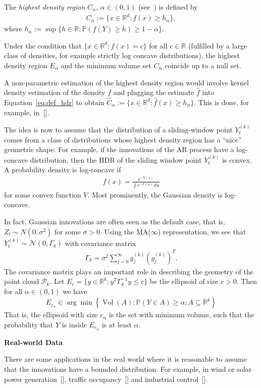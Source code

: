The \textit{highest density region} $C_{\alpha}$, $\alpha\in(0,1)$ (see~\cite{Hyndman01051996}) is defined by
\begin{align}\label{eq:def_hdr}
    C_{\alpha}:=\{x\in\mathbb{R}^d:f(x)\ge h_{\alpha}\},
\end{align}
where $h_{\alpha}:=\sup\{h\in\mathbb{R}:\mathbb{P}(f(Y)\ge h)\ge 1-\alpha\}$.

Under the condition that $\{x\in\mathbb{R}^d:f(x)=c\}$ for all $c\in\mathbb{R}$ (fulfilled by a large class of densities, for example strictly log concave distributions), the highest density region $E_{\alpha}$ and the minimum volume set $C_{\alpha}$ coincide up to a null set. 

A non-parametric estimation of the highest density region would involve kernel density estimation of the density $f$ and plugging the estimate $\hat{f}$ into Equation~\eqref{eq:def_hdr} to obtain $\hat{C}_{\alpha}:=\{x\in\mathbb{R}^d:\hat{f}(x)\ge h_{\alpha}\}$. This is done, for example, in~[].

The idea is now to assume that the distribution of a sliding-window point $Y_t^{(k)}$ comes from a class of distributions whose highest density region has a \enquote{nice} geometric shape. For example, if the innovations of the AR process have a log-concave distribution, then the HDR of the sliding window point $Y_t^{(k)}$ is convex. A probability density is log-concave if
\begin{align*}
    f(x)=\frac{e^{-V(x)}}{\int e^{-V(u)}\,du}
\end{align*}
for some convex function $V$. Most prominently, the Gaussian density is log-concave.

In fact, Gaussian innovations are often seen as the default case, that is, $Z_t\sim N(0,\sigma^2)$ for some $\sigma>0$. Using the MA($\infty$) representation, we see that $Y_t^{(k)}\sim\mathcal{N}(0,\Gamma_k)$ with covariance matrix
\begin{align*}
    \Gamma_k=\sigma^2\sum_{j=0}^{\infty}g_j^{(k)}(g_j^{(k)})^{T}.
\end{align*}
The covariance matrix plays an important role in describing the geometry of the point cloud $\mathcal{P}_k$. Let $E_c=\{y\in\mathbb{R}^k:y^{T}\Gamma_k^{-1}y\le c\}$ be the ellipsoid of size $c>0$. Then for all $\alpha\in(0,1)$ we have
\begin{align*}
    E_{c_{\alpha}}\in\arg\min\left\{\operatorname{Vol}(A):\mathbb{P}(Y\in A)\ge\alpha:A\subseteq\mathbb{R}^{k}\right\}
\end{align*}
That is, the ellipsoid with size $c_{\alpha}$ is the set with minimum volume, such that the probability that $Y$ is inside $E_{c_{\alpha}}$ is at least $\alpha$.


\textbf{Real-world Data}

There are some applications in the real world where it is reasonable to assume that the innovations have a bounded distribution. For example, in wind or solar power generation~[], traffic occupancy~[] and industrial control~[].